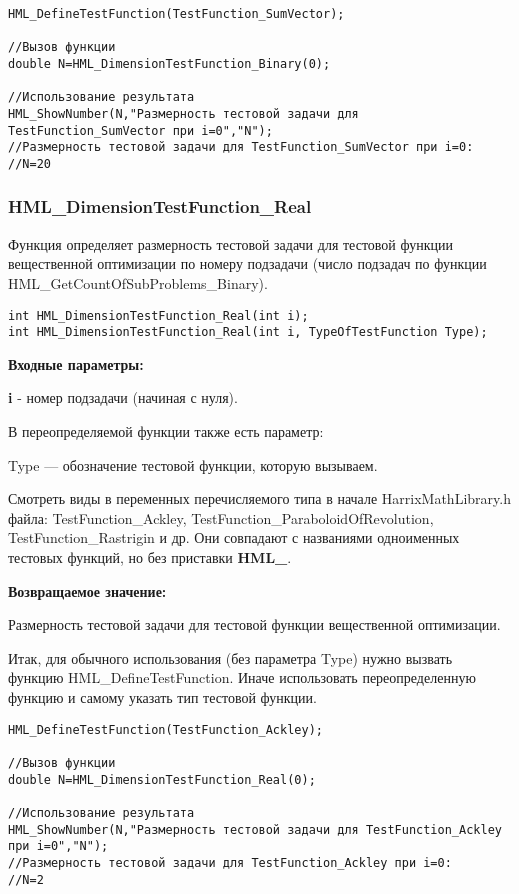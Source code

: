 \documentclass[a4paper,12pt]{article}
\begin{document}
\begin{lstlisting}[label=code_use_HML_DimensionTestFunction_Binary,caption=Пример использования]
HML_DefineTestFunction(TestFunction_SumVector);

//Вызов функции
double N=HML_DimensionTestFunction_Binary(0);

//Использование результата
HML_ShowNumber(N,"Размерность тестовой задачи для TestFunction_SumVector при i=0","N");
//Размерность тестовой задачи для TestFunction_SumVector при i=0:
//N=20
\end{lstlisting}

\subsubsection{HML\_DimensionTestFunction\_Real}\label{HML_DimensionTestFunction_Real}

Функция определяет размерность тестовой задачи для тестовой функции вещественной оптимизации по номеру подзадачи (число подзадач по функции HML\_GetCountOfSubProblems\_Binary).


\begin{lstlisting}[label=code_syntax_HML_DimensionTestFunction_Real,caption=Синтаксис]
int HML_DimensionTestFunction_Real(int i);
int HML_DimensionTestFunction_Real(int i, TypeOfTestFunction Type);
\end{lstlisting}

\textbf{Входные параметры:}

\textbf{i} - номер подзадачи (начиная с нуля).

В переопределяемой функции также есть параметр:
  
Type --- обозначение тестовой функции, которую вызываем. 

Смотреть виды в переменных перечисляемого типа в начале HarrixMathLibrary.h файла: TestFunction\_Ackley, TestFunction\_ParaboloidOfRevolution, TestFunction\_Rastrigin и др. Они совпадают с названиями одноименных тестовых функций, но без приставки \textbf{HML\_}.

\textbf{Возвращаемое значение:}
 
Размерность тестовой задачи для тестовой функции вещественной оптимизации.

Итак, для обычного использования (без параметра Type) нужно вызвать функцию HML\_DefineTestFunction. Иначе использовать переопределенную функцию и самому указать тип тестовой функции.


\begin{lstlisting}[label=code_use_HML_DimensionTestFunction_Real,caption=Пример использования]
HML_DefineTestFunction(TestFunction_Ackley);

//Вызов функции
double N=HML_DimensionTestFunction_Real(0);

//Использование результата
HML_ShowNumber(N,"Размерность тестовой задачи для TestFunction_Ackley при i=0","N");
//Размерность тестовой задачи для TestFunction_Ackley при i=0:
//N=2
\end{lstlisting}
\end{document}
